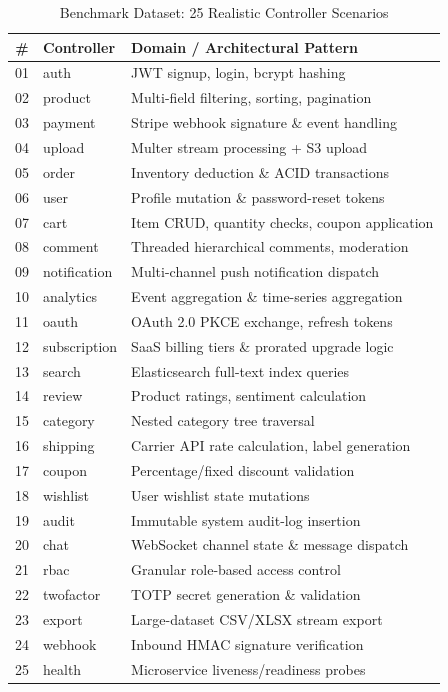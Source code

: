 \documentclass[conference]{IEEEtran}
\begin{document}
\begin{table}[ht]
\centering
\caption{Benchmark Dataset: 25 Realistic Controller Scenarios}
\label{tab:controllers}
\begin{tabular}{@{}cll@{}}
\toprule
\textbf{\#} & \textbf{Controller} & \textbf{Domain / Architectural Pattern} \\
\midrule
01 & auth & JWT signup, login, bcrypt hashing \\
02 & product & Multi-field filtering, sorting, pagination \\
03 & payment & Stripe webhook signature \& event handling \\
04 & upload & Multer stream processing + S3 upload \\
05 & order & Inventory deduction \& ACID transactions \\
06 & user & Profile mutation \& password-reset tokens \\
07 & cart & Item CRUD, quantity checks, coupon application \\
08 & comment & Threaded hierarchical comments, moderation \\
09 & notification & Multi-channel push notification dispatch \\
10 & analytics & Event aggregation \& time-series aggregation \\
11 & oauth & OAuth 2.0 PKCE exchange, refresh tokens \\
12 & subscription & SaaS billing tiers \& prorated upgrade logic \\
13 & search & Elasticsearch full-text index queries \\
14 & review & Product ratings, sentiment calculation \\
15 & category & Nested category tree traversal \\
16 & shipping & Carrier API rate calculation, label generation \\
17 & coupon & Percentage/fixed discount validation \\
18 & wishlist & User wishlist state mutations \\
19 & audit & Immutable system audit-log insertion \\
20 & chat & WebSocket channel state \& message dispatch \\
21 & rbac & Granular role-based access control \\
22 & twofactor & TOTP secret generation \& validation \\
23 & export & Large-dataset CSV/XLSX stream export \\
24 & webhook & Inbound HMAC signature verification \\
25 & health & Microservice liveness/readiness probes \\
\bottomrule
\end{tabular}
\end{table}
\end{document}
